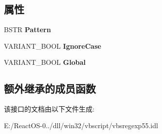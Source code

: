 \subsection*{属性}
\begin{DoxyCompactItemize}
\item 
\mbox{\label{interface_v_b_script___reg_exp__55_1_1_i_reg_exp_a5330de12c77bff684a6fe525c63137e2}} 
B\+S\+TR {\bfseries Pattern}
\item 
\mbox{\label{interface_v_b_script___reg_exp__55_1_1_i_reg_exp_a130e402b5d2aa90010c217ab582832f7}} 
V\+A\+R\+I\+A\+N\+T\+\_\+\+B\+O\+OL {\bfseries Ignore\+Case}
\item 
\mbox{\label{interface_v_b_script___reg_exp__55_1_1_i_reg_exp_a6e2e81911e9844eedd3ce513862db94d}} 
V\+A\+R\+I\+A\+N\+T\+\_\+\+B\+O\+OL {\bfseries Global}
\end{DoxyCompactItemize}
\subsection*{额外继承的成员函数}


该接口的文档由以下文件生成\+:\begin{DoxyCompactItemize}
\item 
E\+:/\+React\+O\+S-\/0../dll/win32/vbscript/vbsregexp55.\+idl\end{DoxyCompactItemize}

